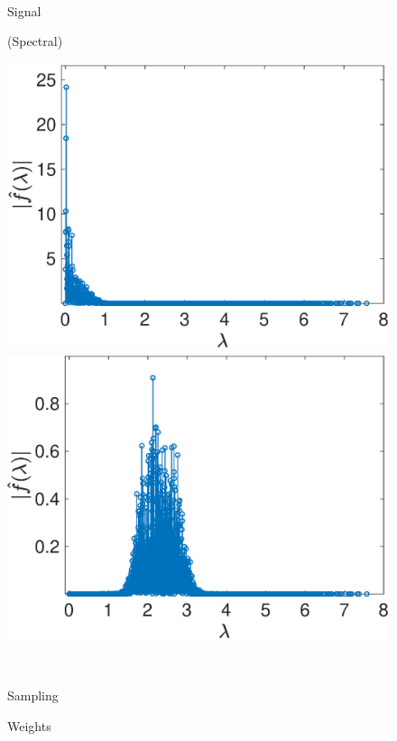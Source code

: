 \documentclass[journal, 10pt]{IEEEtran}
\begin{document}
\begin{figure}[H]
\begin{minipage}[m]{0.4\linewidth}
\end{minipage} \\
\begin{minipage}[m]{0.16\linewidth}
\centerline{\small{Signal}}
\centerline{\small{(Spectral)}}
\end{minipage}
\begin{minipage}[m]{0.4\linewidth}
\centerline{\includegraphics[width=.85\linewidth]{fig_rec_low_signal_spectral}}
\end{minipage}
\begin{minipage}[m]{0.4\linewidth}
\centerline{\includegraphics[width=.85\linewidth]{fig_rec_band_signal_spectral}}
\end{minipage} \\ 
\begin{minipage}[m]{0.16\linewidth}
\centerline{\small{Sampling}}
\centerline{\small{Weights}}
\end{minipage}
\begin{minipage}[m]{0.4\linewidth}

\end{minipage}
\end{figure}
\end{document}
